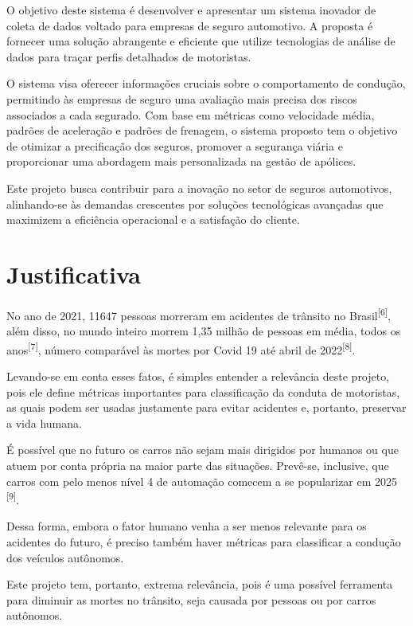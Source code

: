 O objetivo deste sistema é desenvolver e apresentar um sistema inovador de coleta de dados voltado para empresas de seguro automotivo. A proposta é fornecer uma solução abrangente e eficiente que utilize tecnologias de análise de dados para traçar perfis detalhados de motoristas. 

O sistema visa oferecer informações cruciais sobre o comportamento de condução, permitindo às empresas de seguro uma avaliação mais precisa dos riscos associados a cada segurado. Com base em métricas como velocidade média, padrões de aceleração e padrões  de frenagem, o sistema proposto tem o objetivo de otimizar a precificação dos seguros, promover a segurança viária e proporcionar uma abordagem mais personalizada na gestão de apólices. 

Este projeto busca contribuir para a inovação no setor de seguros automotivos, alinhando-se às demandas crescentes por soluções tecnológicas avançadas que maximizem a eficiência operacional e a satisfação do cliente.

 
\section{Justificativa}
No ano de 2021, 11647 pessoas morreram em acidentes de trânsito no Brasil\textsuperscript{[6]}, além disso, no mundo inteiro morrem 1,35 milhão de pessoas em média, todos os anos\textsuperscript{[7]}, número comparável às mortes por Covid 19 até abril de 2022\textsuperscript{[8]}.

Levando-se em conta esses fatos, é simples entender a relevância deste projeto, pois ele define métricas importantes para classificação da conduta de motoristas, as quais podem ser usadas justamente para evitar acidentes e, portanto, preservar a vida humana.

É possível que no futuro os carros não sejam mais dirigidos por humanos ou que atuem por conta própria na maior parte das situações. Prevê-se, inclusive, que carros com pelo menos nível 4 de automação comecem a se popularizar em 2025 \textsuperscript{[9]}.

Dessa forma, embora o fator humano venha a ser menos relevante para os acidentes do futuro, é preciso também haver métricas para classificar a condução dos veículos autônomos.

Este projeto tem, portanto, extrema relevância, pois é uma possível ferramenta para diminuir as mortes no trânsito, seja causada por pessoas ou por carros autônomos.

